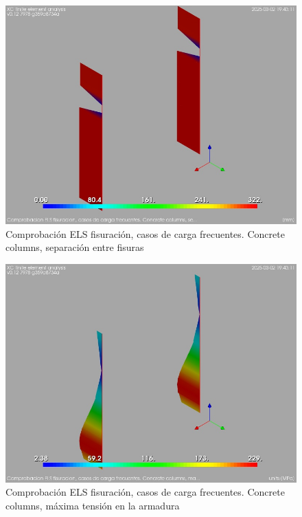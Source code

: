 \begin{figure}[ht]
\begin{center}
\includegraphics[width=\linewidth]{results/graphics/crackingSLS_freq/columnZconcrs_rmax}
\caption{Comprobación ELS fisuración, casos de carga frecuentes. Concrete columns, separación entre fisuras}
\label{SLS_frequentLoadsCrackControlcolumnZconcrs_rmax}
\end{center}
\end{figure}
\begin{figure}[ht]
\begin{center}
\includegraphics[width=\linewidth]{results/graphics/crackingSLS_freq/columnZconcrsigma_s}
\caption{Comprobación ELS fisuración, casos de carga frecuentes. Concrete columns, máxima tensión en la armadura}
\label{SLS_frequentLoadsCrackControlcolumnZconcrsigma_s}
\end{center}
\end{figure}
